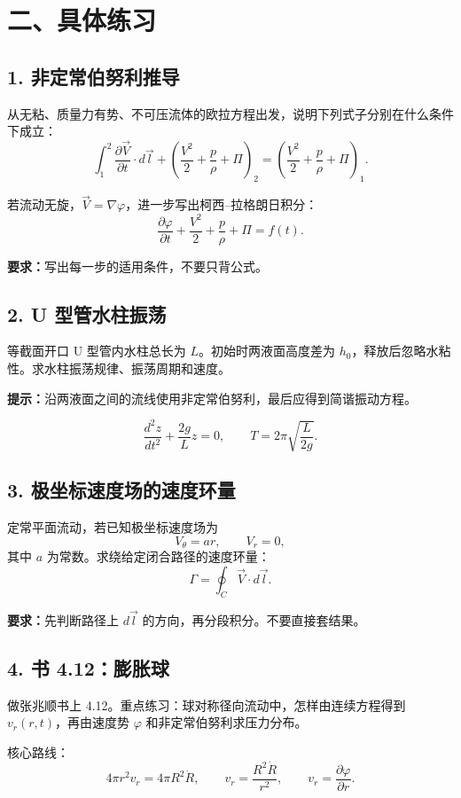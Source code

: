 ﻿\documentclass[UTF8,zihao=-4]{ctexart}
\newcommand{\task}[1]{\textbf{#1}}
\begin{document}
\section*{二、具体练习}

\subsection*{1. 非定常伯努利推导}

从无粘、质量力有势、不可压流体的欧拉方程出发，说明下列式子分别在什么条件下成立：
\[
\int_1^2 \frac{\partial \vec V}{\partial t}\cdot d\vec l
+\left(\frac{V^2}{2}+\frac{p}{\rho}+\Pi\right)_2
=
\left(\frac{V^2}{2}+\frac{p}{\rho}+\Pi\right)_1 .
\]

若流动无旋，$\vec V=\nabla\varphi$，进一步写出柯西--拉格朗日积分：
\[
\frac{\partial \varphi}{\partial t}
+\frac{V^2}{2}+\frac{p}{\rho}+\Pi=f(t).
\]

\task{要求：}写出每一步的适用条件，不要只背公式。

\subsection*{2. U 型管水柱振荡}

等截面开口 U 型管内水柱总长为 $L$。初始时两液面高度差为 $h_0$，释放后忽略水粘性。求水柱振荡规律、振荡周期和速度。

\task{提示：}沿两液面之间的流线使用非定常伯努利，最后应得到简谐振动方程。

\[
\frac{d^2 z}{dt^2}+\frac{2g}{L}z=0,
\qquad
T=2\pi\sqrt{\frac{L}{2g}}.
\]

\subsection*{3. 极坐标速度场的速度环量}

定常平面流动，若已知极坐标速度场为
\[
V_\theta=ar,\qquad V_r=0,
\]
其中 $a$ 为常数。求绕给定闭合路径的速度环量：
\[
\Gamma=\oint_C \vec V\cdot d\vec l.
\]

\task{要求：}先判断路径上 $d\vec l$ 的方向，再分段积分。不要直接套结果。

\subsection*{4. 书 4.12：膨胀球}

做张兆顺书上 4.12。重点练习：球对称径向流动中，怎样由连续方程得到 $v_r(r,t)$，再由速度势 $\varphi$ 和非定常伯努利求压力分布。

核心路线：
\[
4\pi r^2v_r=4\pi R^2\dot R,
\qquad
v_r=\frac{R^2\dot R}{r^2},
\qquad
v_r=\frac{\partial \varphi}{\partial r}.
\]
\end{document}
